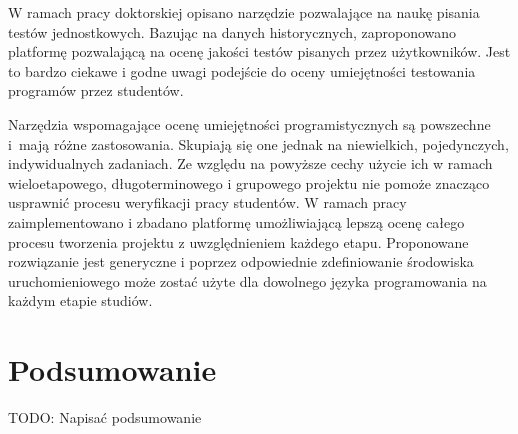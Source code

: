 W ramach pracy doktorskiej \cite{teach-testing-thesis} opisano narzędzie pozwalające na naukę pisania testów jednostkowych.
Bazując na danych historycznych, zaproponowano platformę pozwalającą na ocenę jakości testów pisanych przez użytkowników.
Jest to bardzo ciekawe i godne uwagi podejście do oceny umiejętności testowania programów przez studentów.

Narzędzia wspomagające ocenę umiejętności programistycznych są powszechne i~mają różne zastosowania.
Skupiają się one jednak na niewielkich, pojedynczych, indywidualnych zadaniach.
Ze względu na powyższe cechy użycie ich w ramach wieloetapowego, długoterminowego i grupowego projektu nie pomoże znacząco usprawnić procesu weryfikacji pracy studentów.
W ramach pracy zaimplementowano i zbadano platformę umożliwiającą lepszą ocenę całego procesu tworzenia projektu z uwzględnieniem każdego etapu.
Proponowane rozwiązanie jest generyczne i poprzez odpowiednie zdefiniowanie środowiska uruchomieniowego może zostać użyte dla dowolnego języka programowania na każdym etapie studiów.

\vfill


\section{Podsumowanie}

TODO: Napisać podsumowanie